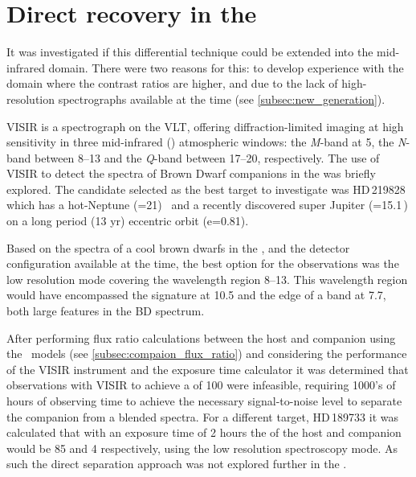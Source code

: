 
\section{Direct recovery in the \mir{}}
\label{sec:mir}
It was investigated if this differential technique could be extended into the mid-infrared {\mir{}} domain.
There were two reasons for this: to develop experience with the {\mir{}} domain where the contrast ratios are higher, and due to the lack of high-resolution \nir{} spectrographs available at the time (see \cref{subsec:new_generation}).

{VISIR} is a \mir{} spectrograph on the {VLT}, offering diffraction-limited imaging at high sensitivity in three mid-infrared (\mir) atmospheric windows: the \emph{M}-band at 5\um{}, the \emph{N}-band between 8--13\um{} and the \emph{Q}-band between 17--20\um{}, respectively.
The use of {VISIR} to detect the spectra of Brown Dwarf companions in the {\mir{}} was briefly explored.
The candidate selected as the best target to investigate was {HD\,219828} which has a hot-Neptune (\Mtwosini{}=21\Mearth)~\citep{melo_new_2007} and a recently discovered super Jupiter (\Mtwosini{}=15.1\,\Mjup) on a long period (13 yr) eccentric orbit (e=0.81)\citep{santos_extreme_2016}.

Based on the spectra of a cool brown dwarfs in the \mir{}, and the detector configuration available at the time, the best option for the observations was the low resolution mode covering the wavelength region 8--13\um{}.
This wavelength region would have encompassed the  signature at 10.5\um{} and the edge of a  band at 7.7\um{}, both large features in the {BD} \mir{} spectrum.

After performing flux ratio calculations between the host and companion using the~\citet{baraffe_evolutionary_2003} models (see \cref{subsec:compaion_flux_ratio}) and considering the performance of the {VISIR} instrument and the exposure time calculator it was determined that observations with {VISIR} to achieve a \snr{} of 100 were infeasible, requiring 1000's of hours of observing time to achieve the necessary signal-to-noise level to separate the companion from a blended spectra.
For a different target, {HD\,189733} it was calculated that with an exposure time of 2 hours the \snr{} of the host and companion would be 85 and 4 respectively, using the low resolution spectroscopy mode.
As such the direct separation approach was not explored further in the \mir{}.
